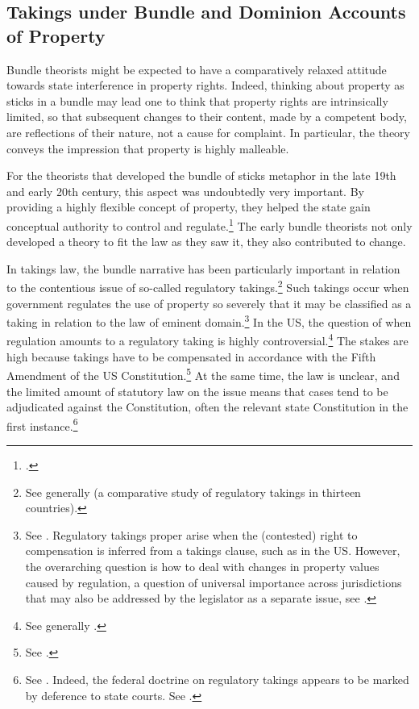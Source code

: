 \subsection{Takings under Bundle and Dominion Accounts of Property}\label{sec:2:3:1}

Bundle theorists might be expected to have a comparatively relaxed attitude towards state interference in property rights. Indeed, thinking about property as sticks in a bundle may lead one to think that property rights are intrinsically limited, so that subsequent changes to their content, made by a competent body, are reflections of their nature, not a cause for complaint. In particular, the theory conveys the impression that property is highly malleable. 

For the theorists that developed the bundle of sticks metaphor in the late 19th and early 20th century, this aspect was undoubtedly very important. By providing a highly flexible concept of property, they helped the state gain conceptual authority to control and regulate.\footcite[195]{klein11} The early bundle theorists not only developed a theory to fit the law as they saw it, they also contributed to change.

In takings law, the bundle narrative has been particularly important in relation to the contentious issue of so-called regulatory takings.\footnote{See generally \cite{alterman10} (a comparative study of   regulatory takings in thirteen countries).} Such takings occur when government regulates the use of property so severely that it may be classified as a taking in relation to the law of eminent domain.\footnote{See \cite[1]{fischel95}. Regulatory takings proper arise when the (contested) right to compensation is inferred from a takings clause, such as in the US. However, the overarching question is how to deal with changes in property values caused by regulation, a question of universal importance across jurisdictions that may also be addressed by the legislator as a separate issue, see \cite[3-10]{alterman10}.} In the US, the question of when regulation amounts to a regulatory taking is highly controversial.\footnote{See generally \cite{fischel95}.} The stakes are high because takings have to be compensated in accordance with the Fifth Amendment of the US Constitution.\footnote{See \cite{fifth}.} At the same time, the law is unclear, and the limited amount of statutory law on the issue means that cases tend to be adjudicated against the Constitution, often the relevant state Constitution in the first instance.\footnote{See \cite[31-32]{alterman10}. Indeed, the federal doctrine on regulatory takings appears to be marked by deference to state courts. See \cite[66]{fischel95}.}

